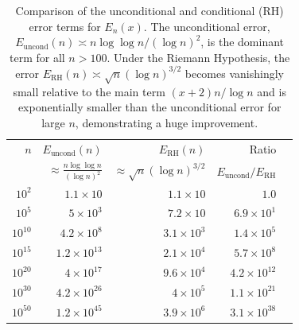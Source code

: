 \documentclass[10pt]{amsart}
\theoremstyle{definition} %
\numberwithin{equation}{section}
\def\dfrac {\displaystyle\frac}
\def\dfrac {\displaystyle\frac}
\begin{document}
\begin{table}[ht]
\centering
\caption{Comparison of the unconditional and conditional (RH) error terms for $E_n(x)$. The unconditional error, $E_{\text{uncond}}(n) \asymp n \log \log n / (\log n)^2$, is the dominant term for all $n > 100$. Under the Riemann Hypothesis, the error $E_{\text{RH}}(n) \asymp \sqrt{n} (\log n)^{3/2}$ becomes vanishingly small relative to the main term $(x+2)n/\log n$ and is exponentially smaller than the unconditional error for large $n$, demonstrating a huge improvement.}
\label{tab:error_comparison}
\begin{tabular}{r|r|r|r|r}
\hline
$n$ & $E_{\text{uncond}}(n)$ & $E_{\text{RH}}(n)$ & Ratio \\
    & $\approx \dfrac{n \log \log n}{(\log n)^2}$ & $\approx \sqrt{n} (\log n)^{3/2}$ & $E_{\text{uncond}} / E_{\text{RH}}$ \\
\hline
$10^{2}$  & $1.1 \times 10$  & $1.1 \times 10$  & $1.0$ \\
$10^{5}$  & $5 \times 10^{3}$  & $7.2 \times 10$  & $6.9 \times 10^{1}$ \\
$10^{10}$ & $4.2 \times 10^{8}$  & $3.1 \times 10^{3}$  & $1.4 \times 10^{5}$ \\
$10^{15}$ & $1.2 \times 10^{13}$ & $2.1 \times 10^{4}$  & $5.7 \times 10^{8}$ \\
$10^{20}$ & $4 \times 10^{17}$ & $9.6 \times 10^{4}$  & $4.2 \times 10^{12}$ \\
$10^{30}$ & $4.2 \times 10^{26}$ & $4 \times 10^{5}$  & $1.1 \times 10^{21}$ \\
$10^{50}$ & $1.2 \times 10^{45}$ & $3.9 \times 10^{6}$  & $3.1 \times 10^{38}$ \\
\hline
\end{tabular}
\end{table}
\end{document}
